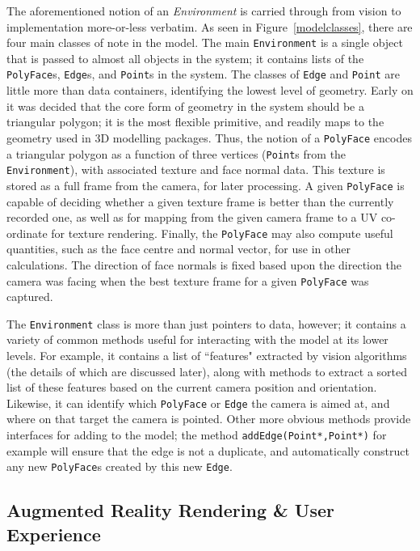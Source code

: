 \documentclass[a4paper,10pt]{article}
\begin{document}
The aforementioned notion of an \textit{Environment} is carried through from vision to implementation more-or-less verbatim. As seen in Figure~\ref{modelclasses}, there are four main classes of note in the model. The main \texttt{Environment} is a single object that is passed to almost all objects in the system; it contains lists of the \texttt{PolyFace}s, \texttt{Edge}s, and \texttt{Point}s in the system. The classes of \texttt{Edge} and \texttt{Point} are little more than data containers, identifying the lowest level of geometry. Early on it was decided that the core form of geometry in the system should be a triangular polygon; it is the most flexible primitive, and readily maps to the geometry used in 3D modelling packages. Thus, the notion of a \texttt{PolyFace} encodes a triangular polygon as a function of three vertices (\texttt{Point}s from the \texttt{Environment}), with associated texture and face normal data. This texture is stored as a full frame from the camera, for later processing. A given \texttt{PolyFace} is capable of deciding whether a given texture frame is better than the currently recorded one, as well as for mapping from the given camera frame to a UV co-ordinate for texture rendering. Finally, the \texttt{PolyFace} may also compute useful quantities, such as the face centre and normal vector, for use in other calculations. The direction of face normals is fixed based upon the direction the camera was facing when the best texture frame for a given \texttt{PolyFace} was captured.

The \texttt{Environment} class is more than just pointers to data, however; it contains a variety of common methods useful for interacting with the model at its lower levels. For example, it contains a list of ``features" extracted by vision algorithms (the details of which are discussed later), along with methods to extract a sorted list of these features based on the current camera position and orientation. Likewise, it can identify which \texttt{PolyFace} or \texttt{Edge} the camera is aimed at, and where on that target the camera is pointed. Other more obvious methods provide interfaces for adding to the model; the method \texttt{addEdge(Point*,Point*)} for example will ensure that the edge is not a duplicate, and automatically construct any new \texttt{PolyFace}s created by this new \texttt{Edge}.

\subsection{Augmented Reality Rendering \& User Experience}
\end{document}
